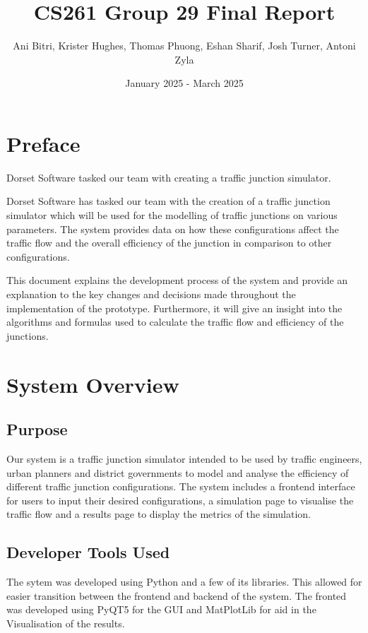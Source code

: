 \documentclass{article}
\title{\vspace{-1.5cm}CS261 Group 29 Final Report}
\author{Ani Bitri, Krister Hughes, Thomas Phuong, Eshan Sharif, Josh Turner, Antoni Zyla}
\date{January 2025 - March 2025}
\begin{document}
    \maketitle

    \section{Preface}

    Dorset Software tasked our team with creating a traffic junction simulator.

    Dorset Software has tasked our team with the creation of a traffic junction simulator which will be used for the modelling of traffic junctions on various parameters. The system provides data on how these configurations
    affect the traffic flow and the overall efficiency of the junction in comparison to other configurations.

    This document explains the development process of the system and provide an explanation to the key changes and decisions made throughout the implementation of the prototype. Furthermore,
    it will give an insight into the algorithms and formulas used to calculate the traffic flow and efficiency of the junctions.


    \section{System Overview}

    \subsection{Purpose}

    Our system is a traffic junction simulator intended to be used by traffic engineers, urban planners and district governments to model and analyse the efficiency of different traffic junction configurations. The
    system includes a frontend interface for users to input their desired configurations, a simulation page to visualise the traffic flow and a results page to display the metrics of the simulation.

    \subsection{Developer Tools Used}

    The sytem was developed using Python and a few of its libraries. This allowed for easier transition between the frontend and backend of the system. The
    fronted was developed using PyQT5 for the GUI and MatPlotLib for aid in the Visualisation of the results.
\end{document}
